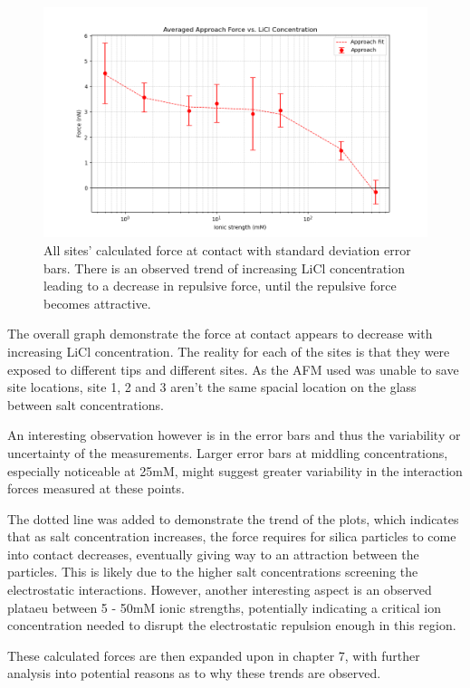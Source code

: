 \begin{figure}
    \centering
    \includegraphics[width=1\linewidth]{chapter5/Average Approach.png}
    \caption{All sites' calculated force at contact with standard deviation error bars. There is an observed trend of increasing LiCl concentration leading to a decrease in repulsive force, until the repulsive force becomes attractive.}
    \label{fig:site1cont}
\end{figure}


The overall graph demonstrate the force at contact appears to decrease with increasing LiCl concentration. The reality for each of the sites is that they were exposed to different tips and different sites. As the AFM used was unable to save site locations, site 1, 2 and 3 aren't the same spacial location on the glass between salt concentrations.

An interesting observation however is in the error bars and thus the variability or uncertainty of the measurements. Larger error bars at middling concentrations, especially noticeable at 25mM, might suggest greater variability in the interaction forces measured at these points.

The dotted line was added to demonstrate the trend of the plots, which indicates that as salt concentration increases, the force requires for silica particles to come into contact decreases, eventually giving way to an attraction between the particles. This is likely due to the higher salt concentrations screening the electrostatic interactions. However, another interesting aspect is an observed plataeu between 5 - 50mM ionic strengths, potentially indicating a critical ion concentration needed to disrupt the electrostatic repulsion enough in this region.

These calculated forces are then expanded upon in chapter 7, with further analysis into potential reasons as to why these trends are observed.